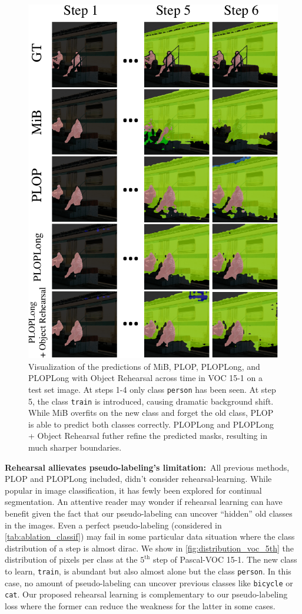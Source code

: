 \begin{figure}
    \centering
    \includegraphics[width=0.8\linewidth]{images/seg/visualization_gt_shift2.pdf}
    \caption{Visualization of the predictions of MiB, PLOP, PLOPLong, and PLOPLong with Object
        Rehearsal across time in VOC 15-1 on a test set image. At steps 1-4 only class \texttt{person}
        has been seen. At step 5, the class \texttt{train} is introduced, causing dramatic background
        shift. While MiB overfits on the new class and forget the old class, PLOP is able to predict
        both classes correctly. PLOPLong and PLOPLong + Object Rehearsal futher refine the predicted
        masks, resulting in much sharper boundaries.}
    \label{fig:visualization_gt_shift}
\end{figure}

\noindent\textbf{Rehearsal allievates pseudo-labeling's limitation:\,} All previous methods, PLOP
and PLOPLong included, didn't consider rehearsal-learning. While popular in image classification, it
has fewly been explored for continual segmentation. An attentive reader may wonder if rehearsal
learning can have benefit given the fact that our pseudo-labeling can uncover ``hidden'' old classes
in the images. Even a perfect pseudo-labeling (considered in \autoref{tab:ablation_classif}) may
fail in some particular data situation where the class distribution of a step is almost dirac. We
show in \autoref{fig:distribution_voc_5th} the distribution of pixels per class at the
$5^{\text{th}}$ step of Pascal-VOC 15-1. The new class to learn, \texttt{train}, is abundant but
also almost alone but the class \texttt{person}. In this case, no amount of pseudo-labeling can
uncover previous classes like \texttt{bicycle} or \texttt{cat}. Our proposed rehearsal learning is
complementary to our pseudo-labeling loss where the former can reduce the weakness for the latter in
some cases.

